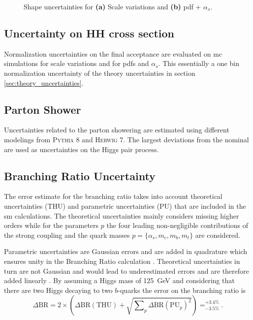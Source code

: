 \begin{figure}
    \centering
    \caption[]{Shape uncertainties for \textbf{(a)} Scale variations and \textbf{(b)} \ac{pdf} + $\alpha_s$.}
\end{figure}

\subsection{Uncertainty on HH cross section}
Normalization uncertainties on the final acceptance are evaluated on \ac{mc} simulations for scale variations and for \acp{pdf} and $\alpha_s$. This essentially a one bin normalization uncertainty of the theory uncertainties in section \ref{sec:theory_uncertainties}.

\subsection{Parton Shower}
Uncertainties related to the parton showering are estimated using different modelings from \textsc{Pythia 8} and \textsc{Herwig 7}. The largest deviations from the nominal are used as uncertainties on the Higgs pair process. 


\subsection{Branching Ratio Uncertainty}
The error estimate for the branching ratio takes into account theoretical uncertainties (THU) and parametric uncertainties (PU) that are included in the \ac{sm} calculations. The theoretical uncertainties mainly considers missing higher orders while for the parameters $p$ the four leading non-negligible contributions of the strong coupling and the quark masses $p=\{\alpha_s,m_c,m_b,m_t\}$ are considered.

Parametric uncertainties are Gaussian errors and are added in quadrature which ensures unity in the Branching Ratio calculation \citep{de2016arxiv}. Theoretical uncertainties in turn are not Gaussian and would lead to underestimated errors and are therefore added linearly \citep{de2016arxiv}. By assuming a Higgs mass of \qty[]{125}{GeV} and considering that there are two Higgs decaying to two $b$-quarks the error on the branching ratio is
\begin{equation}
    \Delta\text{BR} = 2 \times \left(\Delta\text{BR}(\text{THU}) + \sqrt{\sum\nolimits_{p} \Delta\text{BR}(\text{PU}_{p})^2 }\right) = _{-3.5\%}^{+3.4\%}.
\end{equation}

